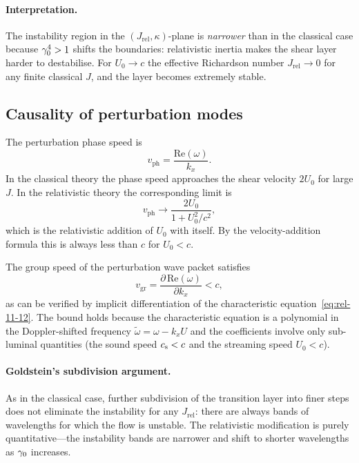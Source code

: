 \paragraph{Interpretation.}
The instability region in the $(J_{\mathrm{rel}},\kappa)$-plane is
\emph{narrower} than in the classical case because $\gamma_{0}^{4}>1$
shifts the boundaries: relativistic inertia makes the shear layer
harder to destabilise.  For $U_{0}\to c$ the effective Richardson number
$J_{\mathrm{rel}}\to 0$ for any finite classical $J$, and the layer
becomes extremely stable.

\subsection{Causality of perturbation modes}

The perturbation phase speed is
\begin{equation}
\label{eq:rel-11-16}
v_{\mathrm{ph}} = \frac{\mathrm{Re}(\omega)}{k_{x}}.
\end{equation}
In the classical theory the phase speed approaches the shear velocity
$2U_{0}$ for large $J$.  In the relativistic theory the corresponding
limit is
\begin{equation}
\label{eq:rel-11-17}
v_{\mathrm{ph}} \to \frac{2U_{0}}{1+U_{0}^{2}/c^{2}},
\end{equation}
which is the relativistic addition of $U_{0}$ with itself.  By the
velocity-addition formula this is always less than $c$ for $U_{0}<c$.

The group speed of the perturbation wave packet satisfies
\begin{equation}
\label{eq:rel-11-18}
\boxed{v_{\mathrm{gr}} = \frac{\partial\,\mathrm{Re}(\omega)}{\partial k_{x}} < c,}
\end{equation}
as can be verified by implicit differentiation of the characteristic
equation~\eqref{eq:rel-11-12}.  The bound holds because the
characteristic equation is a polynomial in the Doppler-shifted
frequency $\tilde{\omega}=\omega-k_{x}U$ and the coefficients involve
only sub-luminal quantities (the sound speed $c_{\mathrm{s}}<c$ and the streaming
speed $U_{0}<c$).

\paragraph{Goldstein's subdivision argument.}
As in the classical case, further subdivision of the transition layer
into finer steps does not eliminate the instability for any $J_{\mathrm{rel}}$:
there are always bands of wavelengths for which the flow is unstable.
The relativistic modification is purely quantitative---the instability
bands are narrower and shift to shorter wavelengths as $\gamma_{0}$
increases.


